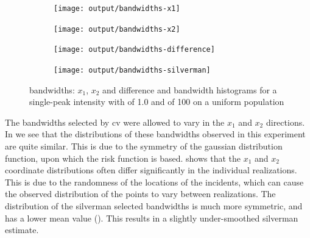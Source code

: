 \begin{figure}[htbp]
    \centering
    \begin{subfigure}[t]{0.45\textwidth}
        \texttt{[image: output/bandwidths-x1]}
        \label{fig:bandwidths:unif_100_1.0_1h:x1}
    \end{subfigure}
    \begin{subfigure}[t]{0.45\textwidth}
        \texttt{[image: output/bandwidths-x2]}
        \label{fig:bandwidths:unif_100_1.0_1h:x2}
    \end{subfigure}

    \begin{subfigure}[t]{0.45\textwidth}
        \texttt{[image: output/bandwidths-difference]}
        \label{fig:bandwidths:unif_100_1.0_1h:diff}
    \end{subfigure}
    \begin{subfigure}[t]{0.45\textwidth}
        \texttt{[image: output/bandwidths-silverman]}
        \label{fig:bandwidths:unif_100_1.0_1h:silverman}
    \end{subfigure}
    \caption[Bandwidths: Single-peak of 100 on uniform population]{ bandwidths: $x_1$, $x_2$ and difference and  bandwidth histograms for  a single-peak intensity with  of 1.0 and  of 100 on a uniform population}
    \label{fig:bandwidths:unif_100_1.0_1h}
\end{figure}

The bandwidths selected by \gls{cv} were allowed to vary in the $x_1$ and $x_2$ directions.
In  we see that the distributions of these bandwidths observed in this experiment are quite similar.
This is due to the symmetry of the gaussian distribution function,
upon which the \gls{risk} function is based.
 shows that the $x_1$ and $x_2$ coordinate distributions often differ significantly in the individual realizations.
This is due to the randomness of the locations of the \glspl{incident},
which can cause the observed distribution of the points to vary between realizations.
The distribution of the \gls{silverman} selected bandwidths is much more symmetric, and has a lower mean value ().
This results in a slightly under-smoothed \gls{silverman} estimate.

